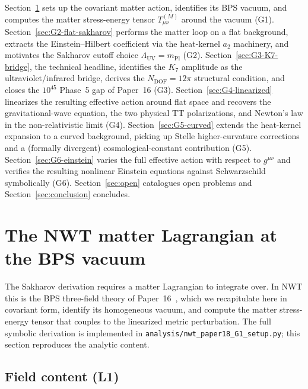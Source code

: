 \documentclass[11pt]{article}
\newcommand{\mPl}{m_{\mathrm{Pl}}}
\begin{document}
Section~\ref{sec:matter-lagrangian} sets up the covariant matter
action, identifies its BPS vacuum, and computes the matter
stress-energy tensor $T^{(M)}_{\mu\nu}$ around the vacuum (G1).
Section~\ref{sec:G2-flat-sakharov} performs the matter loop on a
flat background, extracts the Einstein--Hilbert coefficient via the
heat-kernel $a_2$ machinery, and motivates the Sakharov cutoff
choice $\Lambda_{\mathrm{UV}} = \mPl$ (G2).  Section~\ref{sec:G3-K7-bridge},
the technical headline, identifies the $K_7$ amplitude as the
ultraviolet/infrared bridge, derives the
$N_{\mathrm{DOF}} = 12\pi$ structural condition, and closes the
$10^{45}$ Phase~5 gap of Paper~16 (G3).  Section~\ref{sec:G4-linearized}
linearizes the resulting effective action around flat space and
recovers the gravitational-wave equation, the two physical TT
polarizations, and Newton's law in the non-relativistic limit
(G4).  Section~\ref{sec:G5-curved} extends the heat-kernel
expansion to a curved background, picking up Stelle higher-curvature
corrections and a (formally divergent) cosmological-constant
contribution (G5).  Section~\ref{sec:G6-einstein} varies the full
effective action with respect to $g^{\mu\nu}$ and verifies the
resulting nonlinear Einstein equations against Schwarzschild
symbolically (G6).  Section~\ref{sec:open} catalogues open
problems and Section~\ref{sec:conclusion} concludes.

\section{The NWT matter Lagrangian at the BPS vacuum}
\label{sec:matter-lagrangian}

The Sakharov derivation requires a matter Lagrangian to integrate
over.  In NWT this is the BPS three-field theory of
Paper~16~\cite{paper16}, which we recapitulate here in covariant
form, identify its homogeneous vacuum, and compute the matter
stress-energy tensor that couples to the linearized metric
perturbation.  The full symbolic derivation is implemented in
\texttt{analysis/nwt\_paper18\_G1\_setup.py}; this section
reproduces the analytic content.

\subsection{Field content (L1)}
\end{document}
